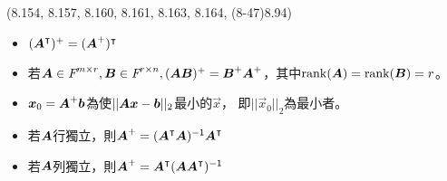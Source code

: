 \begin{theorem}{(8.154, 8.157, 8.160, 8.161, 8.163, 8.164, (8-47)8.94)}
\begin{itemize}
\begin{itemize}
				\item $(\boldsymbol{A}^\intercal)^+ = (\boldsymbol{A}^+)^\intercal$
				\item 若$\boldsymbol{A} \in \textit{F}^{m \times r}, \boldsymbol{B} \in \textit{F}^{r \times n}, (\boldsymbol{AB})^+ = \boldsymbol{B}^+\boldsymbol{A}^+$，其中$\operatorname{rank}(\boldsymbol{A}) = \operatorname{rank}(\boldsymbol{B}) = r$。
				\item $\boldsymbol{x}_0 = \boldsymbol{A}^+\boldsymbol{b}$為使$||\boldsymbol{A}\boldsymbol{x} - \boldsymbol{b}||_2$最小的$\vec{x}$，
				即$||\vec{x}_0||_2$為最小者。
				\item 若$\boldsymbol{A}$行獨立，則$\boldsymbol{A}^+ = (\boldsymbol{A}^\intercal\boldsymbol{A})^{\mathsf{-1}}\boldsymbol{A}^\intercal$
				\item 若$\boldsymbol{A}$列獨立，則$\boldsymbol{A}^+ = \boldsymbol{A}^\intercal(\boldsymbol{A}\boldsymbol{A}^\intercal)^{\mathsf{-1}}$
			\end{itemize}
	\end{itemize}
\end{theorem}
